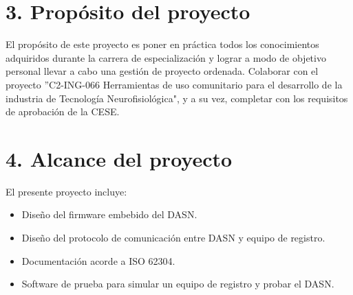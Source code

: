 \documentclass[
11pt, %
codirector, %
]{charter}
\begin{document}
%
%
%
% 
%

\section{3. Propósito del proyecto}
\label{sec:proposito}

El propósito de este proyecto es poner en práctica todos los conocimientos adquiridos durante la carrera de especialización y lograr a modo de objetivo personal llevar a cabo una gestión de proyecto ordenada. Colaborar con el proyecto ''C2-ING-066 Herramientas de uso comunitario para el desarrollo de la industria de Tecnología Neurofisiológica", y a su vez, completar con los requisitos de aprobación de la CESE.

%

\section{4. Alcance del proyecto}
\label{sec:alcance}

El presente proyecto incluye:
\begin{itemize}
	\item Diseño del firmware embebido del DASN.
	\item Diseño del protocolo de comunicación entre DASN y equipo de registro.
	\item Documentación acorde a ISO 62304.
	\item Software de prueba para simular un equipo de registro y probar el DASN.
\end{itemize}
\end{document}
